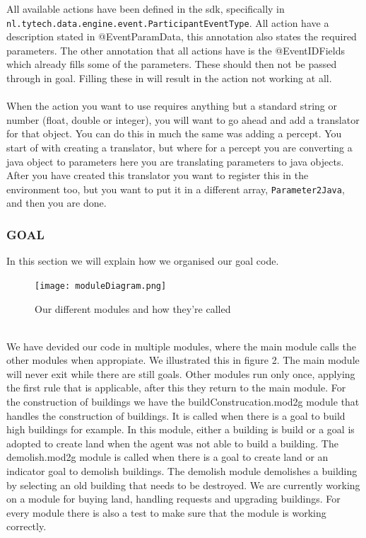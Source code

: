 All available actions have been defined in the sdk, specifically in \\\verb|nl.tytech.data.engine.event.ParticipantEventType|. 
All action have a description stated in @EventParamData, this annotation also states the required parameters. 
The other annotation that all actions have is the @EventIDFields which already fills some of the parameters. 
These should then not be passed through in goal. 
Filling these in will result in the action not working at all.\\
\\
When the action you want to use requires anything but a standard string or number (float, double or integer), you will want to go ahead and add a translator for that object.
You can do this in much the same was adding a percept.
You start of with creating a translator, but where for a percept you are converting a java object to parameters here you are translating parameters to java objects.
After you have created this translator you want to register this in the environment too, but you want to put it in a different array, \verb|Parameter2Java|, and then you are done.

\subsubsection{GOAL}

In this section we will explain how we organised our goal code.
\begin{figure}[h!]
\texttt{[image: moduleDiagram.png]}
\caption{Our different modules and how they're called}
\label{fig:Modules}
\end{figure}
\\
We have devided our code in multiple modules, where the main module calls the other modules when appropiate. We illustrated this in figure 2.
The main module will never exit while there are still goals. Other modules run only once, applying the first rule that is applicable, after this they return to the main module.
For the construction of buildings we have the buildConstrucation.mod2g module that handles the construction of buildings. It is called when there is a goal to build high buildings for example. In this module, either a building is build or a goal is adopted to create land when the agent was not able to build a building.
The demolish.mod2g module is called when there is a goal to create land or an indicator goal to demolish buildings. The demolish module demolishes a building by selecting an old building that needs to be destroyed. We are currently working on a module for buying land, handling requests and upgrading buildings.
For every module there is also a test to make sure that the module is working correctly.

